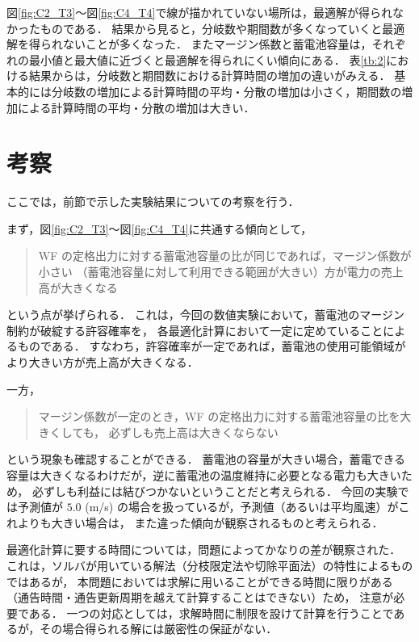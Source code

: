 \documentclass[a4paper,12pt,showkeys]{jreport}
\begin{document}
図\ref{fig:C2_T3}～図\ref{fig:C4_T4}で線が描かれていない場所は，最適解が得られなかったものである．
結果から見ると，分岐数や期間数が多くなっていくと最適解を得られないことが多くなった．
またマージン係数と蓄電池容量は，それぞれの最小値と最大値に近づくと最適解を得られにくい傾向にある．
表\ref{tb:2}における結果からは，分岐数と期間数における計算時間の増加の違いがみえる．
基本的には分岐数の増加による計算時間の平均・分散の増加は小さく，期間数の増加による計算時間の平均・分散の増加は大きい．



\newpage
\section{考察}
ここでは，前節で示した実験結果についての考察を行う．

まず，図\ref{fig:C2_T3}～図\ref{fig:C4_T4}に共通する傾向として，
%
\begin{quotation}
WF の定格出力に対する蓄電池容量の比が同じであれば，マージン係数が小さい
（蓄電池容量に対して利用できる範囲が大きい）方が電力の売上高が大きくなる
\end{quotation}
%
という点が挙げられる．
これは，今回の数値実験において，蓄電池のマージン制約が破綻する許容確率を，
各最適化計算において一定に定めていることによるものである．
すなわち，許容確率が一定であれば，蓄電池の使用可能領域がより大きい方が売上高が大きくなる．

一方，
%
\begin{quotation}
マージン係数が一定のとき，WF の定格出力に対する蓄電池容量の比を大きくしても，
必ずしも売上高は大きくならない
\end{quotation}
%
という現象も確認することができる．
蓄電池の容量が大きい場合，蓄電できる容量は大きくなるわけだが，逆に蓄電池の温度維持に必要となる電力も大きいため，
必ずしも利益には結びつかないということだと考えられる．
今回の実験では予測値が $5.0$ (m/s) の場合を扱っているが，予測値（あるいは平均風速）がこれよりも大きい場合は，
また違った傾向が観察されるものと考えられる．

最適化計算に要する時間については，問題によってかなりの差が観察された．
これは，ソルバが用いている解法（分枝限定法や切除平面法）の特性によるものではあるが，
本問題においては求解に用いることができる時間に限りがある（通告時間・通告更新周期を越えて計算することはできない）ため，
注意が必要である．
一つの対応としては，求解時間に制限を設けて計算を行うことであるが，その場合得られる解には厳密性の保証がない．
\end{document}
